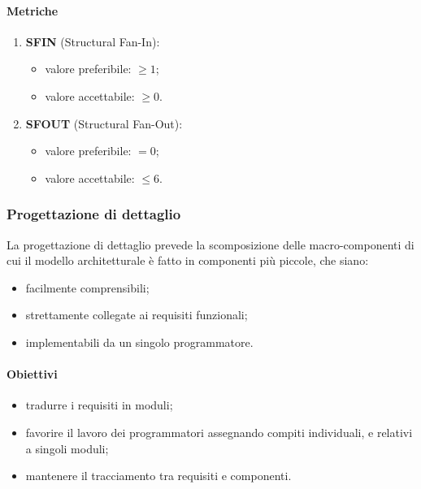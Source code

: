         \paragraph{Metriche}
            \begin{enumerate}
                \item \textbf{SFIN} (Structural Fan-In):
                \begin{itemize}
                    \item valore preferibile: $\geq 1$;
                    \item valore accettabile: $\geq 0$.
                \end{itemize}
                \item \textbf{SFOUT} (Structural Fan-Out):
                \begin{itemize}
                    \item valore preferibile: $=0$;
                    \item valore accettabile: $\leq 6$.
                \end{itemize}
            \end{enumerate}
    \subsubsection{Progettazione di dettaglio}
        La progettazione di dettaglio prevede la scomposizione delle macro-componenti di cui il modello architetturale è fatto in componenti più piccole, che siano:
        \begin{itemize}
            \item facilmente comprensibili;
            \item strettamente collegate ai requisiti funzionali;
            \item implementabili da un singolo programmatore.
        \end{itemize}
        \paragraph{Obiettivi}
            \begin{itemize}
                \item tradurre i requisiti in moduli;
                \item favorire il lavoro dei programmatori assegnando compiti individuali, e relativi a singoli moduli;
                \item mantenere il tracciamento tra requisiti e componenti.
            \end{itemize}
